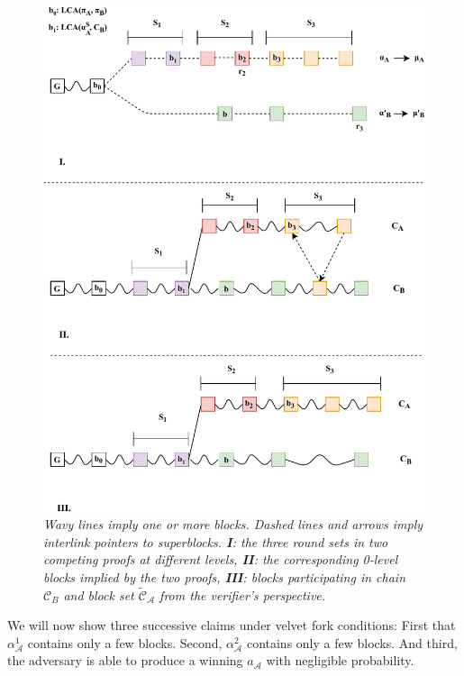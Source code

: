 \begin{figure}[h!]
	\begin{center}
    \includegraphics[scale=0.65]{figures/proof_velvet-crop.pdf}
	\end{center}
	\caption{\textit{ Wavy lines imply one or more blocks. Dashed lines and arrows imply
	interlink pointers to superblocks. \textbf{I}: the three round sets in two competing
	proofs at different levels, \textbf{II}: the corresponding 0-level blocks implied by the two proofs,
	\textbf{III}: blocks participating in chain $\mathcal{C}_B$ and block set $\widetilde{\mathcal{C}}_\mathcal{A}$ from the verifier's perspective.}}	
    \label{fig:proof_velvet}
\end{figure}

We will now show three successive claims under velvet fork conditions: First that $\alpha_\mathcal{A}^1$ contains only a few blocks. Second,  $\alpha_\mathcal{A}^2$ contains only a few blocks. And third,
the adversary is able to produce a winning $a_\mathcal{A}$ with negligible probability.\\


